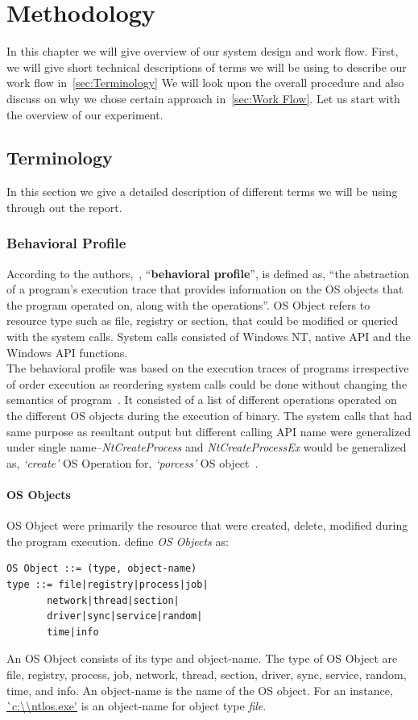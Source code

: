 \chapter{Methodology}\label{chapter:methodology}
In this chapter we will give overview of our system design and work flow.
First, we will give short technical descriptions of terms we will be using to describe our work flow in~\autoref{sec:Terminology}
We will look upon the overall procedure and also discuss on why we chose certain approach in~\autoref{sec:Work Flow}.
Let us start with the overview of our experiment.
\section{Terminology}
\label{sec:Terminology}
In this section we give a detailed description of different terms we will be using through out the report.
\subsection{Behavioral Profile}
\label{sub:Behavioral Profile}
According to the authors,~\citeauthor{bayer}, ``\textbf{behavioral profile}'', is defined as, ``the abstraction of a program's execution trace that provides information on the OS objects that the program operated on, along with the operations''.
OS Object refers to resource type such as file, registry or section, that could be modified or queried with the system calls.
System calls consisted of Windows NT, native API and the Windows API functions.\\
The behavioral profile was based on the execution traces of programs irrespective of order execution as reordering system calls could be done without changing the semantics of program~\cite[]{bayer}.
It consisted of a list of different operations operated on the different OS objects during the execution of binary.
The system calls that had same purpose as resultant output but different calling API name were generalized under single name--\emph{NtCreateProcess} and \emph{NtCreateProcessEx} would be generalized as, \emph{`create'} OS Operation for, \emph{`porcess'} OS object~\cite[]{bayer}.\\
\subsubsection{OS Objects}
\label{ssub:OS Objects}
OS Object were primarily the resource that were created, delete, modified during the program execution.
\citeauthor{bayer} define \emph{OS Objects} as:
\begin{lstlisting}
OS Object ::= (type, object-name)
type ::= file|registry|process|job|
       network|thread|section|
       driver|sync|service|random|
       time|info
\end{lstlisting}
An OS Object consists of its type and object-name.
The type of OS Object are file, registry, process, job, network, thread, section, driver, sync, service, random, time, and info.
An object-name is the name of the OS object.
For an instance, \url{`c:\\ntlos.exe'} is an object-name for object type \emph{file}.

